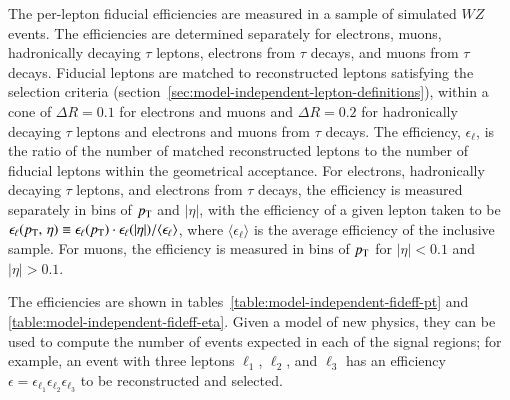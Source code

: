 The per-lepton fiducial efficiencies are measured in a sample of simulated $WZ$ events. The efficiencies are determined separately for electrons, muons, hadronically decaying $\tau$ leptons, electrons from $\tau$ decays, and muons from $\tau$ decays. Fiducial leptons are matched to reconstructed leptons satisfying the selection criteria (section~\ref{sec:model-independent-lepton-definitions}), within a cone of $\Delta R=0.1$ for electrons and muons and $\Delta R=0.2$ for hadronically decaying $\tau$ leptons and electrons and muons from $\tau$ decays. The efficiency, $\epsilon_{\ell}$, is the ratio of the number of matched reconstructed leptons to the number of fiducial leptons within the geometrical acceptance. For electrons, hadronically decaying $\tau$ leptons, and electrons from $\tau$ decays, the efficiency is measured separately in bins of $p_{\text{T}}$ and $|\eta|$, with the efficiency of a given lepton taken to be $\epsilon_{\ell}(\pt,\,\eta) \equiv \epsilon_{\ell}(\pt)\cdot\epsilon_{\ell}(|\eta|) / \langle \epsilon_{\ell} \rangle$, where $\langle \epsilon_{\ell} \rangle$ is the average efficiency of the inclusive sample. For muons, the efficiency is measured in bins of $p_{\text{T}}$ for $|\eta|<0.1$ and $|\eta|>0.1$. 

The efficiencies are shown in tables~\ref{table:model-independent-fideff-pt} and \ref{table:model-independent-fideff-eta}. Given a model of new physics, they can be used to compute the number of events expected in each of the signal regions; for example, an event with three leptons $\ell_1$, $\ell_2$, and $\ell_3$ has an efficiency $\epsilon=\epsilon_{\ell_1}\epsilon_{\ell_2}\epsilon_{\ell_3}$ to be reconstructed and selected. 

